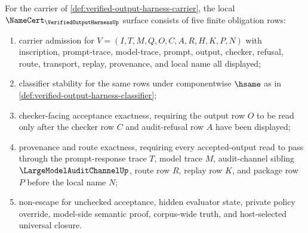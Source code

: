 \begin{theorem}
\label{thm:verified-output-harness-namecert-obligations}
For the carrier of \autoref{def:verified-output-harness-carrier}, the local $\NameCert_{\VerifiedOutputHarnessUp}$ surface consists of five finite obligation rows:
\begin{enumerate}
\item carrier admission for $V=(I,T,M,Q,O,C,A,R,H,K,P,N)$ with inscription, prompt-trace, model-trace, prompt, output, checker, refusal, route, transport, replay, provenance, and local name all displayed;
\item classifier stability for the same rows under componentwise $\hsame$ as in \autoref{def:verified-output-harness-classifier};
\item checker-facing acceptance exactness, requiring the output row $O$ to be read only after the checker row $C$ and audit-refusal row $A$ have been displayed;
\item provenance and route exactness, requiring every accepted-output read to pass through the prompt-response trace $T$, model trace $M$, audit-channel sibling $\LargeModelAuditChannelUp$, route row $R$, replay row $K$, and package row $P$ before the local name $N$;
\item non-escape for unchecked acceptance, hidden evaluator state, private policy override, model-side semantic proof, corpus-wide truth, and host-selected universal closure.
\end{enumerate}
\end{theorem}
